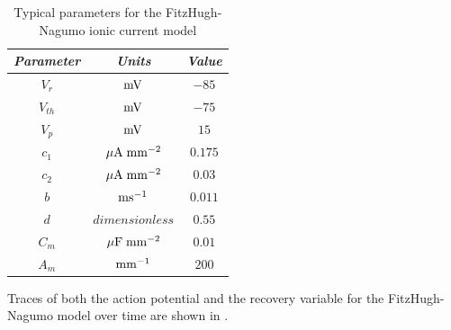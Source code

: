 \begin{table}[hbtp] \centering
  \begin{tabular}{|c|c|c|}
    \hline
    \emph{Parameter} & \emph{Units} & \emph{Value} \\ 
    \hline
    \hline 
    $V_r$ & $\mathrm{mV}$ & $-85$ \\
    $V_{th}$ & $\mathrm{mV}$ & $-75$ \\
    $V_p$ & $\mathrm{mV}$ & $15$ \\
    $c_1$ & $\mathrm{\mu A}\thickspace\mathrm{mm}^{-2}$ & $0.175$ \\
    $c_2$ & $\mathrm{\mu A}\thickspace\mathrm{mm}^{-2}$ & $0.03$ \\
    $b$ & $\mathrm{\mathrm{ms}^{-1}}$ & $0.011$ \\
    $d$ & $dimensionless$ & $0.55$ \\
    $C_m$ & $\mathrm{\mu F}\thickspace\mathrm{mm}^{-2}$ & $0.01$ \\
    $A_m$ & $\mathrm{mm}^{-1}$ & $200$ \\
    \hline
  \end{tabular}
  \caption[Typical parameters for the FitzHugh-Nagumo ionic current model]{Typical
    parameters for the FitzHugh-Nagumo ionic current model}
  \label{tab:FitzHugh-Nagumo_Model_Params}
\end{table}
Traces of both the action potential and the recovery variable for the
FitzHugh-Nagumo model over time are shown in .

